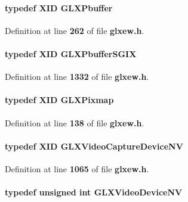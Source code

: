 \paragraph[{G\+L\+X\+Pbuffer}]{\setlength{\rightskip}{0pt plus 5cm}typedef X\+ID {\bf G\+L\+X\+Pbuffer}}\label{glxew_8h_a0e12899d42d3570d659900a17247cb71}


Definition at line {\bf 262} of file {\bf glxew.\+h}.

\paragraph[{G\+L\+X\+Pbuffer\+S\+G\+IX}]{\setlength{\rightskip}{0pt plus 5cm}typedef X\+ID {\bf G\+L\+X\+Pbuffer\+S\+G\+IX}}\label{glxew_8h_ab1266042d7daf35af48c5372ae4bfcf7}


Definition at line {\bf 1332} of file {\bf glxew.\+h}.

\paragraph[{G\+L\+X\+Pixmap}]{\setlength{\rightskip}{0pt plus 5cm}typedef X\+ID {\bf G\+L\+X\+Pixmap}}\label{glxew_8h_a6577d581069de43ebaac50c78dbccbd0}


Definition at line {\bf 138} of file {\bf glxew.\+h}.

\paragraph[{G\+L\+X\+Video\+Capture\+Device\+NV}]{\setlength{\rightskip}{0pt plus 5cm}typedef X\+ID {\bf G\+L\+X\+Video\+Capture\+Device\+NV}}\label{glxew_8h_a336ce7c0aab103ac70bae44de7ea87d6}


Definition at line {\bf 1065} of file {\bf glxew.\+h}.

\paragraph[{G\+L\+X\+Video\+Device\+NV}]{\setlength{\rightskip}{0pt plus 5cm}typedef unsigned {\bf int} {\bf G\+L\+X\+Video\+Device\+NV}}\label{glxew_8h_afe2acbb4a962d7ef1575a68f864a5226}


